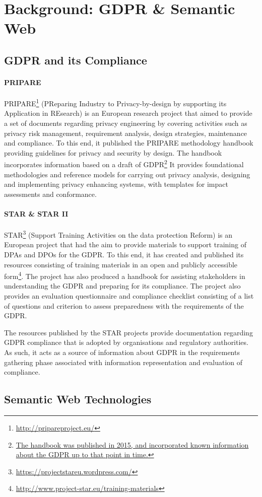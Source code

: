 \chapter{Background: GDPR \& Semantic Web}
\label{chapter:background}

\section{GDPR and its Compliance}\label{sec:background:GDPR}
\subsubsection{PRIPARE}
PRIPARE\footnote{\url{http://pripareproject.eu/}} (PReparing Industry to Privacy-by-design by supporting its Application in REsearch) is an European research project that aimed to provide a set of documents regarding privacy engineering by covering activities such as privacy risk management, requirement analysis, design strategies, maintenance and compliance. To this end, it published the PRIPARE methodology handbook \cite{noauthor_pripare-methodology-handbook-final-feb-24-2016.pdf_nodate} providing guidelines for privacy and security by design. The handbook incorporates information based on a draft of GDPR\footnote{\url{The handbook was published in 2015, and incorporated known information about the GDPR up to that point in time.}} It provides foundational methodologies and reference models for carrying out privacy analysis, designing and implementing privacy enhancing systems, with templates for impact assessments and conformance. 

\subsubsection{STAR \& STAR II}
STAR\footnote{\url{https://projectstareu.wordpress.com/}} (Support Training Activities on the data protection Reform) is an European project that had the aim to provide materials to support training of DPAs and DPOs for the GDPR. To this end, it has created and published its resources consisting of training materials in an open and publicly accessible form\footnote{\url{http://www.project-star.eu/training-materials}}. The project has also produced a handbook for assisting stakeholders in understanding the GDPR and preparing for its compliance. The project also provides an evaluation questionnaire and compliance checklist \cite{noauthor_gdpr_2019-1}consisting of a list of questions and criterion to assess preparedness with the requirements of the GDPR. 

The resources published by the STAR projects provide documentation regarding GDPR compliance that is adopted by organisations and regulatory authorities. As such, it acts as a source of information about GDPR in the requirements gathering phase associated with information representation and evaluation of compliance.

\section{Semantic Web Technologies}\label{sec:background:semweb}
